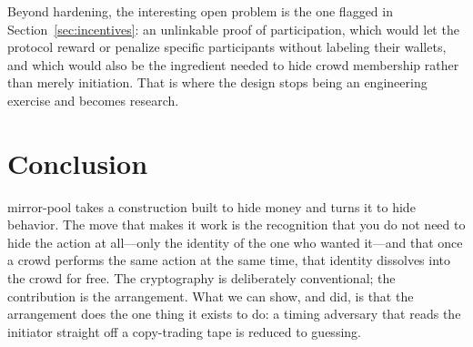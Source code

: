 \documentclass[11pt]{article}
\begin{document}
Beyond hardening, the interesting open problem is the one flagged in
Section~\ref{sec:incentives}: an unlinkable proof of participation, which would let
the protocol reward or penalize specific participants without labeling their
wallets, and which would also be the ingredient needed to hide crowd membership
rather than merely initiation. That is where the design stops being an
engineering exercise and becomes research.

\section{Conclusion}

mirror-pool takes a construction built to hide money and turns it to hide
behavior. The move that makes it work is the recognition that you do not need to
hide the action at all---only the identity of the one who wanted it---and that
once a crowd performs the same action at the same time, that identity dissolves
into the crowd for free. The cryptography is deliberately conventional; the
contribution is the arrangement. What we can show, and did, is that the arrangement
does the one thing it exists to do: a timing adversary that reads the initiator
straight off a copy-trading tape is reduced to guessing.
\end{document}
